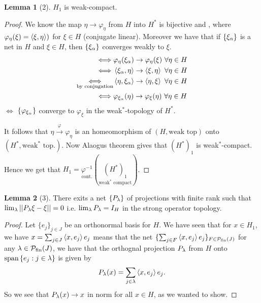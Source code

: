 \documentclass[10pt,english,a4paper]{article}
\theoremstyle{definition}
\newtheorem*{lemma}{Lemma}
\let\emph\relax %
\def\Psfin{\mathcal{P}_{\textnormal{fin}}}
\def\vphi{\varphi}
\begin{document}
\begin{lemma}[2]
    $H_1$ is weak-compact. 
\end{lemma}

\begin{proof}
    We know the map $\eta  \to \vphi_{\eta}$ from $H $ into $H^*$ is bijective 
and \emph{isometric}, where $\varphi_{\eta}(\xi) = \left\langle \xi,\eta \right\rangle)$ for $\xi \in H$
(conjugate linear). Moreover we have that if $\{\xi_{\alpha}\}$ is a net in $H$
and $\xi \in H$, then $\{\xi_{\alpha}\}$ converges weakly to $\xi$.
 \begin{align*}
     \iff& \varphi_{\eta}(\xi_{\al}) \to \varphi_{\eta}(\xi) ~\forall \eta \in H \\
     \iff& \ind{\xi_{\al},\eta} \to \ind{\xi,\eta} ~\forall \eta \in H \\
     \underset{\text{by conjugation}}{\iff}& \ind{\eta, \xi_{\al}} \to \ind{\eta, \xi} ~\forall \eta \in H \\
\iff&\vphi_{\xi_{\al}}(\eta) \to \varphi_{\xi}(\eta) ~\forall\eta\in H
 \end{align*}
$\iff$ $\{\vphi_{\xi_{\al}}\}$ converge to $\vphi_{\xi}$ in the weak$^*$-topology
of $H^*$.

It follows that $\eta \overset{\varphi}{\to} \varphi_{\eta}$ is an
homeomorphism of $(H,\text{weak top})$ onto $(H^*, \text{weak}^*\text{ top.})$.
Now Alaogus theorem gives that $(H^*)_1$ is weak$^*$-compact. 
Hence we get that $H_1 = \underset{\text{cont.}}{\varphi^{-1}}(\underset{\text{weak}^*\text{ compact}}{(H^*)_1})$.
\end{proof}

\begin{lemma}[3]
    There exits a net $\{P_{\lambda}\}$ of projections with finite rank such that 
    $\lim_{\lambda} ||P_{\lambda} \xi - \xi|| = 0$ i.e. $\lim_{\lambda} P_{\lambda} = I_{H}$ 
    in the strong operator topology. 
\end{lemma}
\begin{proof}
   Let $\{e_j\}_{j\in J}$ be an orthonormal basis for $H$. We have seen that for $x \in H_1$, 
we have $x = \sum_{j \in J} \left\langle x,e_j \right\rangle e_j$ means that the net $\{ \sum_{j\in F} \ind{x,e_j}e_j \}_{F\in\Psfin(J)}$ for any $\la \in \Psfin(J)$, we have that the orthognal projection
$P_{\lambda}$ from $H$ onto  $\text{span} \left\{e_j:j\in \lambda\right\}$ is given by 
\[ P_{\lambda}(x) = \sum_{j\in\lambda} \left\langle x,e_j \right\rangle e_j. \]
So we see that $P_{\lambda}(x) \to x$ in norm for all $x \in H$, as we wanted to show.
\end{proof}
\end{document}
